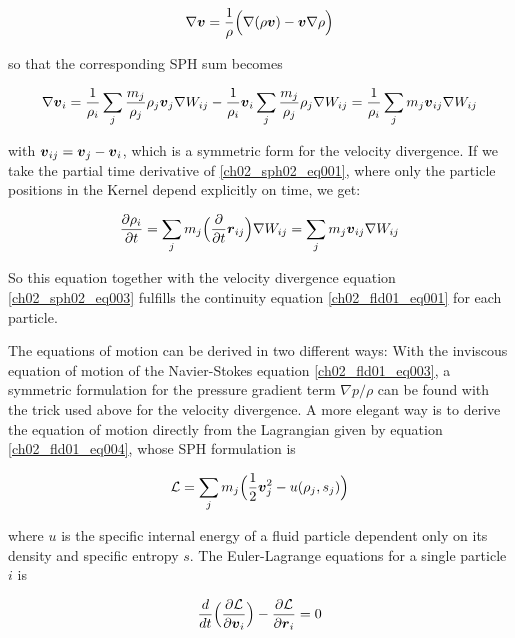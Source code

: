 \begin{equation}
\label{ch02_sph02_eq003}
\nabla \boldsymbol{v} = \frac{1}{\rho} \Big( \nabla (\rho \boldsymbol{v}) - \boldsymbol{v} \nabla \rho \Big)
\end{equation}

so that the corresponding SPH sum becomes 

\begin{equation}
\label{ch02_sph02_eq003}
\nabla \boldsymbol{v}_i = \frac{1}{\rho_i} \sum_{j} \frac{m_j}{\rho_j} \rho_j \boldsymbol{v}_j \nabla W_{ij} - \frac{1}{\rho_i} \boldsymbol{v}_i \sum_{j} \frac{m_j}{\rho_j} \rho_j \nabla W_{ij} = \frac{1}{\rho_i} \sum_{j} m_j \boldsymbol{v}_{ij} \nabla W_{ij} 
\end{equation}

with $\boldsymbol{v}_{ij} = \boldsymbol{v}_j - \boldsymbol{v}_i$, which is a symmetric form for the velocity divergence. If we take the partial time derivative of \ref{ch02_sph02_eq001}, where only the particle positions in the Kernel depend explicitly on time, we get: 

\begin{equation}
\label{ch02_sph02_eq004}
\frac{\partial \rho_i}{\partial t}  = \sum_{j} m_j \Big( \frac{\partial}{\partial t} \boldsymbol{r}_{ij} \Big) \nabla W_{ij} = \sum_{j} m_j \boldsymbol{v}_{ij} \nabla W_{ij} 
\end{equation}

So this equation together with the velocity divergence equation \ref{ch02_sph02_eq003} fulfills the continuity equation \ref{ch02_fld01_eq001} for each particle.

The equations of motion can be derived in two different ways: With the inviscous equation of motion of the Navier-Stokes equation \ref{ch02_fld01_eq003}, a symmetric formulation for the pressure gradient term $\nabla p / \rho$ can be found with the trick used above for the velocity divergence. 
A more elegant way is to derive the equation of motion directly from the Lagrangian given by equation \ref{ch02_fld01_eq004}, whose SPH formulation is

\begin{equation}
\label{ch02_sph02_eq004}
\mathcal{L} = \sum_{j} m_j \Big( \frac{1}{2} \boldsymbol{v}_j^2 - u(\rho_j, s_j) \Big) 
\end{equation}

where $u$ is the specific internal energy of a fluid particle dependent only on its density and specific entropy $s$. The Euler-Lagrange equations for a single particle $i$ is

\begin{equation}
\label{ch02_sph02_eq005}
\frac{d}{dt} \Big( \frac{\partial \mathcal{L}}{\partial \boldsymbol{v}_i} \Big) - \frac{\partial \mathcal{L}}{\partial \boldsymbol{r}_i} = 0
\end{equation}


